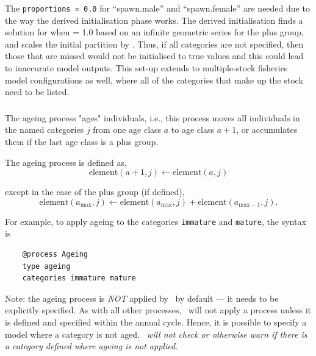 The \texttt{proportions = 0.0} for \enquote{spawn.male} and \enquote{spawn.female} are needed due to the way the derived initialisation phase works. The derived initialisation finds a solution for when  = 1.0 based on an infinite geometric series for the plus group, and scales the initial partition by . Thus, if all categories are not specified, then those that are missed would not be initialised to true values and this could lead to inaccurate model outputs. This set-up extends to multiple-stock fisheries model configurations as well, where all of the categories that make up the stock need to be listed.

\subsubsection{\label{sec:Process-Ageing}}

The ageing process "ages" individuals, i.e., this process moves all individuals in the named categories $j$ from one age class $a$ to age class $a + 1$, or accumulates them if the last age class is a plus group.

The ageing process is defined as,
\begin{equation}
  \text{element}(a + 1,j) \leftarrow \text{element}(a,j)
\end{equation}

except in the case of the plus group (if defined),
\begin{equation}
  \text{element}(a_{\text{max}}, j) \leftarrow \text{element}(a_{\text{max}}, j) + \text{element}(a_{\text{max}-1}, j).
\end{equation}

For example, to apply ageing to the categories \texttt{immature} and \texttt{mature}, the syntax is

{\small{\begin{verbatim}
	@process Ageing
	type ageing
	categories immature mature
	\end{verbatim}}}

Note: the ageing process is \emph{NOT} applied by \CNAME\ by default --- it needs to be explicitly specified. As with all other processes, \CNAME\ will not apply a process unless it is defined and specified within the annual cycle. Hence, it is possible to specify a model where a category is not aged. \emph{\CNAME\ will not check or otherwise warn if there is a category defined where ageing is not applied.}

\subsubsection{\label{sec:Process-Mortality}}

